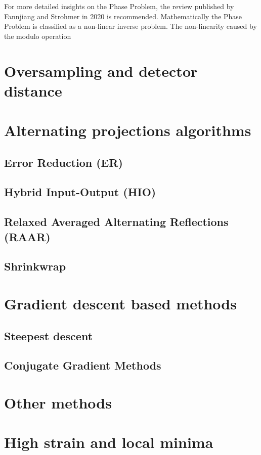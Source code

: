 For more detailed insights on the Phase Problem, the review published by Fannjiang and Strohmer in 2020 \cite{Fannjiang2020} is recommended. 
Mathematically the Phase Problem is classified as a non-linear inverse problem. The non-linearity caused by the 
modulo operation 

\section{Oversampling and detector distance}
\section{Alternating projections algorithms}
\subsection{Error Reduction (ER)}
\subsection{Hybrid Input-Output (HIO)}
\subsection{Relaxed Averaged Alternating Reflections (RAAR)}
\subsection{Shrinkwrap}

\section{Gradient descent based methods}
\subsection{Steepest descent}
\subsection{Conjugate Gradient Methods}

\section{Other methods}
\section{High strain and local minima}